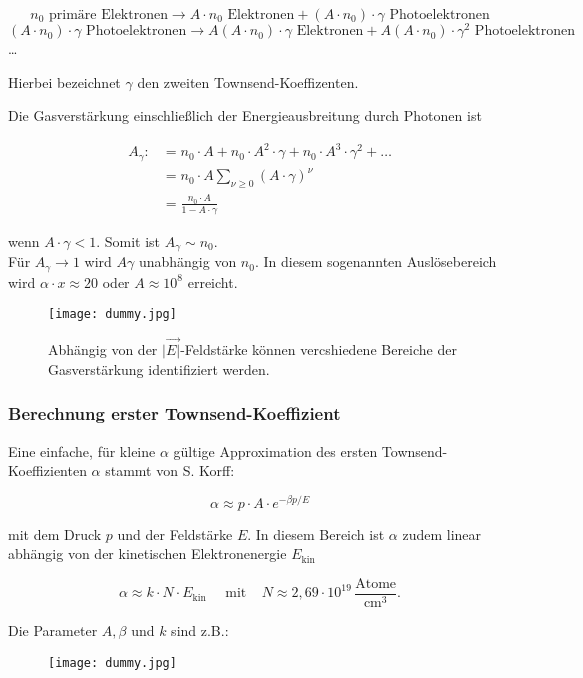 \[n_0 \text{ primäre Elektronen} \longrightarrow A\cdot n_0 \text{ Elektronen} + (A\cdot n_0)\cdot
\gamma \text{ Photoelektronen}\]
\[(A\cdot n_0)\cdot\gamma \text{ Photoelektronen} \longrightarrow A(A\cdot n_0)\cdot \gamma
\text{ Elektronen} + A(A\cdot n_0)\cdot \gamma^2 \text{ Photoelektronen}\]
\ldots

Hierbei bezeichnet $\gamma$ den zweiten Townsend-Koeffizenten.

Die Gasverstärkung einschließlich der Energieausbreitung durch Photonen ist


\begin{align*}
A_\gamma :&= n_0\cdot A + n_0\cdot A^2\cdot\gamma + n_0\cdot A^3\cdot\gamma^2 + \ldots\\
&=n_0\cdot A \sum_{\nu\geq0}(A\cdot\gamma)^\nu  \\
&= \frac{n_0\cdot A}{1- A\cdot\gamma}
\end{align*}

wenn $A\cdot\gamma<1$. Somit ist $A_\gamma\sim n_0$.
\\
Für $A_\gamma\rightarrow 1$ wird $A\gamma$ unabhängig von $n_0$. In diesem sogenannten
Auslösebereich wird $\alpha\cdot x\approx 20$ oder $A\approx10^8$ erreicht.

\begin{figure}[H]
	\centering
	\texttt{[image: dummy.jpg]}
	\caption{Abhängig von der $|\vec{E|}$-Feldstärke können vercshiedene Bereiche der Gasverstärkung
	identifiziert werden.}
\end{figure}

\subsubsection*{Berechnung erster Townsend-Koeffizient}

Eine einfache, für kleine $\alpha$ gültige Approximation des ersten Townsend-Koeffizienten $\alpha$
stammt von S. Korff:

\[\alpha \approx p\cdot A\cdot e^{-\beta p/E}  \]

mit dem Druck $p$ und der Feldstärke $E$. In diesem Bereich ist $\alpha$ zudem linear abhängig von
der kinetischen Elektronenergie $E_\text{kin}$

\[\alpha \approx k\cdot N \cdot E_\text{kin} ~~~~~~ \text{mit}~~~~~N\approx 2{,}69\cdot
10^{19}\,\frac{\text{Atome}}{\text{cm}^3}.\]

Die Parameter $A, \beta$ und $k$ sind z.B.:

\begin{figure}[H]
	\centering
	\texttt{[image: dummy.jpg]}
\end{figure}

